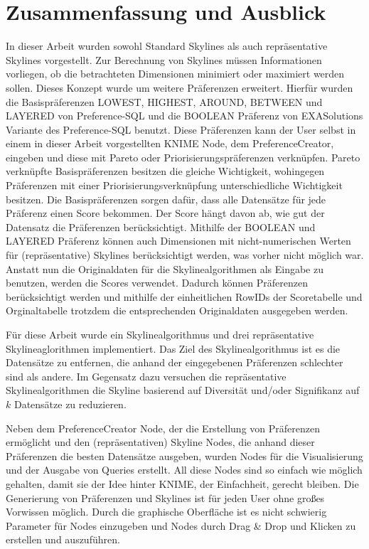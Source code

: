 \chapter{Zusammenfassung und Ausblick}
\label{ch:Zusammenfassung}
In dieser Arbeit wurden sowohl Standard Skylines als auch repräsentative Skylines vorgestellt. Zur Berechnung von Skylines müssen Informationen vorliegen, ob die betrachteten Dimensionen minimiert oder maximiert werden sollen. Dieses Konzept wurde um weitere Präferenzen erweitert. Hierfür wurden die Basispräferenzen LOWEST, HIGHEST, AROUND, BETWEEN und LAYERED von Preference-SQL und die BOOLEAN Präferenz von EXASolutions Variante des Preference-SQL benutzt. 
Diese Präferenzen kann der User selbst in einem in dieser Arbeit vorgestellten KNIME Node, dem PreferenceCreator, eingeben und diese mit Pareto oder Priorisierungspräferenzen verknüpfen. Pareto verknüpfte Basispräferenzen besitzen die gleiche Wichtigkeit, wohingegen Präferenzen mit einer Priorisierungsverknüpfung unterschiedliche Wichtigkeit besitzen. Die Basispräferenzen sorgen dafür, dass alle Datensätze für jede Präferenz einen Score bekommen. Der Score hängt davon ab, wie gut der Datensatz die Präferenzen berücksichtigt. 
Mithilfe der BOOLEAN und LAYERED Präferenz können auch Dimensionen mit nicht-numerischen Werten für (repräsentative) Skylines berücksichtigt werden, was vorher nicht möglich war.  
Anstatt nun die Originaldaten für die Skylinealgorithmen als Eingabe zu benutzen, werden die Scores verwendet. Dadurch können Präferenzen berücksichtigt werden und mithilfe der einheitlichen RowIDs der Scoretabelle und Orginaltabelle trotzdem die entsprechenden Originaldaten ausgegeben werden. 

Für diese Arbeit wurde ein Skylinealgorithmus und drei repräsentative Skylineaglorithmen implementiert. Das Ziel des Skylinealgorithmus ist es die Datensätze zu entfernen, die anhand der eingegebenen Präferenzen schlechter sind als andere. Im Gegensatz dazu versuchen die repräsentative Skylinealgorithmen die Skyline basierend auf Diversität und/oder Signifikanz auf $k$ Datensätze zu reduzieren.

Neben dem PreferenceCreator Node, der die Erstellung von Präferenzen ermöglicht und den (repräsentativen) Skyline Nodes, die anhand dieser Präferenzen die besten Datensätze ausgeben, wurden Nodes für die Visualisierung und der Ausgabe von Queries erstellt. All diese Nodes sind so einfach wie möglich gehalten, damit sie der Idee hinter KNIME, der Einfachheit, gerecht bleiben. Die Generierung von Präferenzen und Skylines ist für jeden User ohne großes Vorwissen möglich. Durch die graphische Oberfläche ist es nicht schwierig Parameter für Nodes einzugeben und Nodes durch Drag \& Drop und Klicken zu erstellen und auszuführen.  

